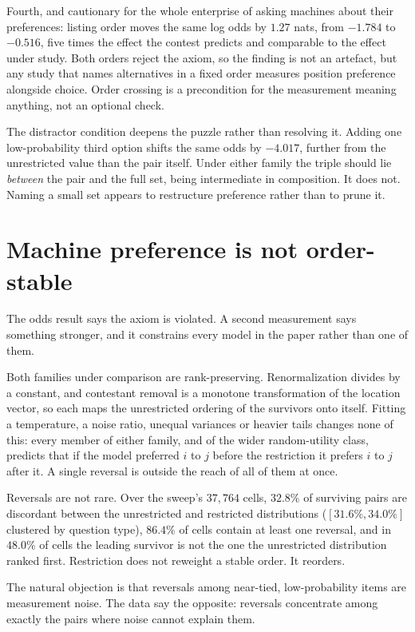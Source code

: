 \documentclass[11pt]{article}
\begin{document}
Fourth, and cautionary for the whole enterprise of asking machines about their
preferences: listing order moves the same log odds by $1.27$ nats, from
$-1.784$ to $-0.516$, five times the effect the contest predicts and comparable
to the effect under study. Both orders reject the axiom, so the finding is not an
artefact, but any study that names alternatives in a fixed order measures
position preference alongside choice. Order crossing is a precondition for the
measurement meaning anything, not an optional check.

The distractor condition deepens the puzzle rather than resolving it. Adding one
low-probability third option shifts the same odds by $-4.017$, further from the
unrestricted value than the pair itself. Under either family the triple should
lie \emph{between} the pair and the full set, being intermediate in composition.
It does not. Naming a small set appears to restructure preference rather than to
prune it.

\section{Machine preference is not order-stable}
\label{sec:order}

The odds result says the axiom is violated. A second measurement says something
stronger, and it constrains every model in the paper rather than one of them.

Both families under comparison are rank-preserving. Renormalization divides by a
constant, and contestant removal is a monotone transformation of the location
vector, so each maps the unrestricted ordering of the survivors onto itself.
Fitting a temperature, a noise ratio, unequal variances or heavier tails changes
none of this: every member of either family, and of the wider random-utility
class, predicts that if the model preferred $i$ to $j$ before the restriction it
prefers $i$ to $j$ after it. A single reversal is outside the reach of all of
them at once.

Reversals are not rare. Over the sweep's $37{,}764$ cells, $32.8\%$ of surviving
pairs are discordant between the unrestricted and restricted distributions
($[31.6\%, 34.0\%]$ clustered by question type), $86.4\%$ of cells contain at
least one reversal, and in $48.0\%$ of cells the leading survivor is not the one
the unrestricted distribution ranked first. Restriction does not reweight a
stable order. It reorders.

The natural objection is that reversals among near-tied, low-probability items
are measurement noise. The data say the opposite: reversals concentrate among
exactly the pairs where noise cannot explain them.
\end{document}
